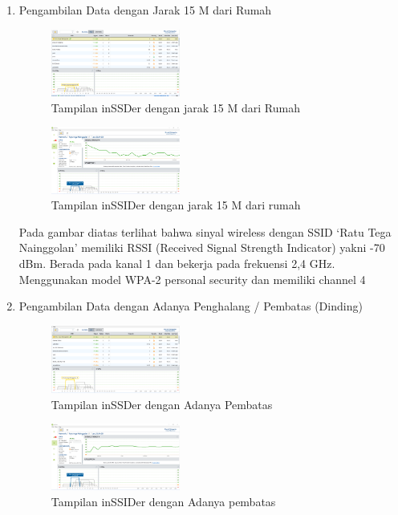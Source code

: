 \documentclass[conference]{IEEEtran}
\begin{document}
\begin{enumerate}
    \item Pengambilan Data dengan Jarak 15 M dari Rumah

    \begin{figure}
        \centering
        \includegraphics[width=0.4\textwidth]{10.png}
        \caption{Tampilan inSSDer dengan jarak 15 M dari Rumah}
    \end{figure}

    \begin{figure}
        \centering
        \includegraphics[width=0.4\textwidth]{11.png}
        \caption{Tampilan inSSIDer dengan jarak 15 M dari rumah}
    \end{figure}

\vspace{0.2cm}

Pada gambar diatas terlihat bahwa sinyal wireless dengan
SSID ‘Ratu Tega Nainggolan’ memiliki RSSI (Received
Signal Strength Indicator) yakni -70 dBm. Berada
pada kanal 1 dan bekerja pada frekuensi 2,4 GHz. Menggunakan
model WPA-2 personal security dan memiliki
channel 4
\vspace{0.2cm}  

    \item Pengambilan Data dengan Adanya Penghalang / Pembatas (Dinding)

    \begin{figure}
        \centering
        \includegraphics[width=0.4\textwidth]{12.png}
        \caption{Tampilan inSSDer dengan Adanya Pembatas}
    \end{figure}

    \begin{figure}
        \centering
        \includegraphics[width=0.4\textwidth]{13.png}
        \caption{Tampilan inSSIDer dengan Adanya pembatas}
    \end{figure}


\end{enumerate}
\end{document}
